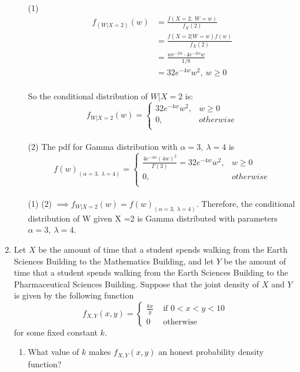 \documentclass[11pt]{article}
\begin{document}
\begin{enumerate}[label=\textbf{Question \arabic*:},start=1]
\begin{enumerate}
(1) \begin{align*}
f_{(W | X = 2)}(w) & = \frac{f(X=2,\ W=w)}{f_X(2)} \\
& = \frac{f(X=2|W=w) f(w)}{f_X(2)} \\
& =  \frac{w e^{-2w} \cdot 4 e^{-2w} w}{1/8} \\
& = 32 e^{-4w} w^2 ,\ w \geq 0
\end{align*}\\
So the conditional distribution of $W|X=2$ is:
$$f_{W | X = 2}(w) =\begin{cases}
		32 e^{-4w} w^2, & w \geq 0 \\ 
		0, & otherwise\\
		\end{cases}$$\\


(2) The pdf for Gamma distribution with $\alpha=3,\ \lambda=4$ is \\
$$f(w)_{(\alpha=3,\ \lambda=4)} = \begin{cases}
		\frac{4 e^{-4w} (4w)^2}{\Gamma(3) } = 32 e^{-4w} w^2, & w \geq 0 \\ 
		0, & otherwise\\
		\end{cases}$$\\
(1) (2) $\implies f_{W | X = 2}(w) = f(w)_{(\alpha=3,\ \lambda=4)}$. Therefore, the conditional distribution of W given X =2 is Gamma distributed with parameters $\alpha=3,\ \lambda=4$.

\end{enumerate}




\item Let $X$ be the amount of time that a student spends walking from the Earth Sciences Building to the Mathematics Building, and let $Y$ be the amount of time that a student spends walking from the Earth Sciences Building to the Pharmaceutical Sciences Building. Suppose that the joint density of $X$ and $Y$ is given by the following function
\[
f_{X,Y}(x,y) = \left\{
\begin{array}{ll}
\frac {kx}y & \mbox{ if } 0 < x < y < 10 \\
0 & \mbox{ otherwise} 
\end{array}
\right.
\]
for some fixed constant $k$. 
\begin{enumerate}
	\item What value of $k$ makes $f_{X,Y}(x,y)$ an honest probability density function?\\
	

\end{enumerate}
\end{enumerate}
\end{document}
